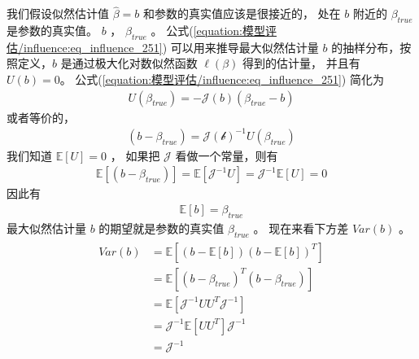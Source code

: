 \documentclass[letterpaper,10pt,english]{sphinxmanual}
\begin{document}
我们假设似然估计值 \(\hat{\beta}=b\) 和参数的真实值应该是很接近的，
处在 \(b\) 附近的 \(\beta_{true}\) 是参数的真实值。
 \(b\) ， \(\beta_{true}\)
。
公式(\ref{equation:模型评估/influence:eq_influence_251}) 可以用来推导最大似然估计量 \(b\)
的抽样分布，按照定义，\(b\) 是通过极大化对数似然函数 \(\ell(\beta)\) 得到的估计量，
并且有 \(U(b)=0\)。
公式(\ref{equation:模型评估/influence:eq_influence_251}) 简化为
\begin{equation}\label{equation:模型评估/influence:模型评估/influence:25}
\begin{split}U(\beta_{true}) = -\mathcal{J}(b)(\beta_{true}-b)\end{split}
\end{equation}
或者等价的，
\begin{equation}\label{equation:模型评估/influence:模型评估/influence:26}
\begin{split}(b-\beta_{true}) = \mathcal{J(b)}^{-1}U(\beta_{true})\end{split}
\end{equation}
我们知道 \(\mathbb{E}[U]=0\) ，
如果把 \(\mathcal{J}\) 看做一个常量，则有
\begin{equation}\label{equation:模型评估/influence:模型评估/influence:27}
\begin{split}\mathbb{E}[(b-\beta_{true})] = \mathbb{E}[\mathcal{J}^{-1} U ]
= \mathcal{J}^{-1} \mathbb{E}[U ]
=0\end{split}
\end{equation}
因此有
\begin{equation}\label{equation:模型评估/influence:模型评估/influence:28}
\begin{split}\mathbb{E}[b] = \beta_{true}\end{split}
\end{equation}
最大似然估计量 \(b\) 的期望就是参数的真实值 \(\beta_{true}\) 。
现在来看下方差 \(Var(b)\) 。
\begin{align}\label{equation:模型评估/influence:模型评估/influence:29}\!\begin{aligned}
Var(b) &= \mathbb{E} \left [ (b-\mathbb{E}[b])(b-\mathbb{E}[b])^T \right ]\\
&= \mathbb{E} \left[ (b-\beta_{true})^T(b-\beta_{true}) \right ]\\
&=  \mathbb{E} \left[ \mathcal{J}^{-1}U U^T \mathcal{J}^{-1} \right ]\\
&=   \mathcal{J}^{-1} \mathbb{E} \left[ U U^T  \right ] \mathcal{J}^{-1}\\
&=  \mathcal{J}^{-1}\\
\end{aligned}\end{align}
\end{document}
